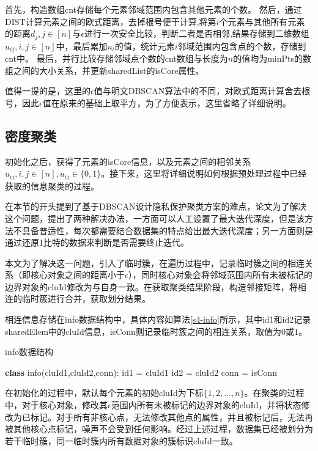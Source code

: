 首先，构造数组cnt存储每个元素邻域范围内包含其他元素的个数。
然后，通过DIST计算元素之间的欧式距离，去掉根号便于计算,将第$ i $个元素与其他所有元素的距离$ d_j,j\in[n] $与$ \epsilon $进行一次安全比较，判断二者是否相邻,结果存储到二维数组$ u_{ij},i,j\in[n] $中，最后累加$ u_i$的值，统计元素$ i $邻域范围内包含点的个数，存储到cnt中。
最后，并行比较存储邻域点个数的cnt数组与长度为$ n $的值均为minPts的数组之间的大小关系，并更新sharedList的isCore属性。

值得一提的是，这里的$\epsilon$值与明文DBSCAN算法中的不同，对欧式距离计算舍去根号，因此$\epsilon$值在原来的基础上取平方，为了方便表示，这里省略了详细说明。


\subsection{密度聚类}
\label{t1-julei}
初始化之后，获得了元素的isCore信息，以及元素之间的相邻关系$ u_{ij},i,j\in[n],u_{ij}\in\{0,1\} $。接下来，这里将详细说明如何根据预处理过程中已经获取的信息聚类的过程。

在本节的开头提到了基于DBSCAN设计隐私保护聚类方案的难点，论文\cite{bozdemir2021privacy}为了解决这个问题，提出了两种解决办法，一方面可以人工设置了最大迭代深度，但是该方法不具备普适性，每次都需要结合数据集的特点给出最大迭代深度；另一方面则是通过还原1比特的数据来判断是否需要终止迭代。

本文为了解决这一问题，引入了临时簇，在遍历过程中，记录临时簇之间的相连关系（即核心对象之间的距离小于$\epsilon$），同时核心对象会将邻域范围内所有未被标记的边界对象的cluId修改为与自身一致。在获取聚类结果阶段，构造邻接矩阵，将相连的临时簇进行合并，获取划分结果。

相连信息存储在info数据结构中，具体内容如算法\ref{s4-info}所示，其中id1和id2记录sharedElem中的cluId信息，isConn则记录临时簇之间的相连关系，取值为0或1。
\begin{algorithm}
	\caption{info数据结构}
	\label{s4-info}
	\begin{algorithmic}[1]
		\STATE \textbf{class} info(cluId1,cluId2,conn):
		\STATE \hspace{\algorithmicindent} id1 = cluId1
		\STATE \hspace{\algorithmicindent} id2 = cluId2
		\STATE \hspace{\algorithmicindent} conn = isConn
	\end{algorithmic}
\end{algorithm}

在初始化的过程中，默认每个元素的初始cluId为下标$ \{1,2,...,n\} $。在聚类的过程中，对于核心对象，修改其$ \epsilon $范围内所有未被标记的边界对象的cluId，并将状态修改为已标记。对于所有非核心点，无法修改其他点的属性，并且被标记后，无法再被其他核心点标记，噪声不会受到任何影响。经过上述过程，数据集已经被划分为若干临时簇，同一临时簇内所有数据对象的簇标识cluId一致。

